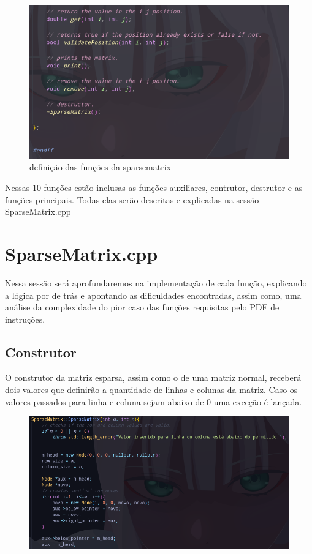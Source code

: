 \documentclass[a4paper,12pt]{article}
\begin{document}
\begin{figure}[H]
\centering
\includegraphics[width=1\textwidth]{Imagens/sparsematrixH/sparsematrixH-pt2.png}
\caption{\label{fig:sparsematrixh} definição das funções da sparsematrix}
\end{figure}

Nessas 10 funções estão inclusas as funções auxiliares, contrutor, destrutor e as funções principais. Todas elas serão descritas e explicadas na sessão SparseMatrix.cpp

\section{SparseMatrix.cpp}
Nessa sessão será aprofundaremos na implementação de cada função, explicando a lógica por de trás e apontando as dificuldades encontradas, assim como, uma análise da complexidade do pior caso das funções requisitas pelo PDF de instruções.

\subsection{Construtor}
O construtor da matriz esparsa, assim como o de uma matriz normal, receberá dois valores que definirão a quantidade de linhas e colunas da matriz.
Caso os valores passados para linha e coluna sejam abaixo de 0 uma exceção é lançada. 

\begin{figure}[H]
\centering
\includegraphics[width=1\textwidth]{Imagens/sparsematrixCPP/sparsematrix-construtor-pt1.png}
\caption{\label{fig:sparsematrix}}
\end{figure}
\end{document}

